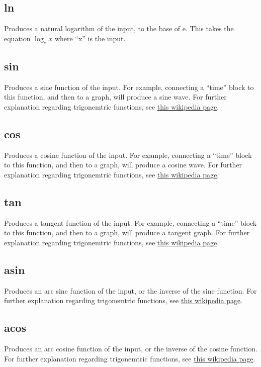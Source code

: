 \subsection{ln}\label{Operation:ln} Produces a natural logarithm of the input, to the base of e.
This takes the equation $\log_{e} x$ where ``x'' is the input.

\subsection{sin}\label{Operation:sin} Produces a sine function of the input. For example, 
connecting a ``time'' block to this function, and then to a graph, will produce a sine wave.
For further explanation regarding trigonemtric functions, 
see \href{https://en.wikipedia.org/wiki/Trigonometric_functions}{this wikipedia page}.

\subsection{cos}\label{Operation:cos} Produces a cosine function of the input. For example, 
connecting a ``time'' block to this function, and then to a graph, will produce a cosine wave.
For further explanation regarding trigonemtric functions, 
see \href{https://en.wikipedia.org/wiki/Trigonometric_functions}{this wikipedia page}.

\subsection{tan}\label{Operation:tan} Produces a tangent function of the input. For example, 
connecting a ``time'' block to this function, and then to a graph, will produce a tangent graph.
For further explanation regarding trigonemtric functions, 
see \href{https://en.wikipedia.org/wiki/Trigonometric_functions}{this wikipedia page}.

\subsection{asin}\label{Operation:asin} Produces an arc sine function of the input, 
or the inverse of the sine function. For further explanation regarding trigonemtric functions, 
see \href{https://en.wikipedia.org/wiki/Trigonometric_functions}{this wikipedia page}.

\subsection{acos}\label{Operation:acos} Produces an arc cosine function of the input, 
or the inverse of the cosine function. For further explanation regarding trigonemtric functions, 
see \href{https://en.wikipedia.org/wiki/Trigonometric_functions}{this wikipedia page}.

